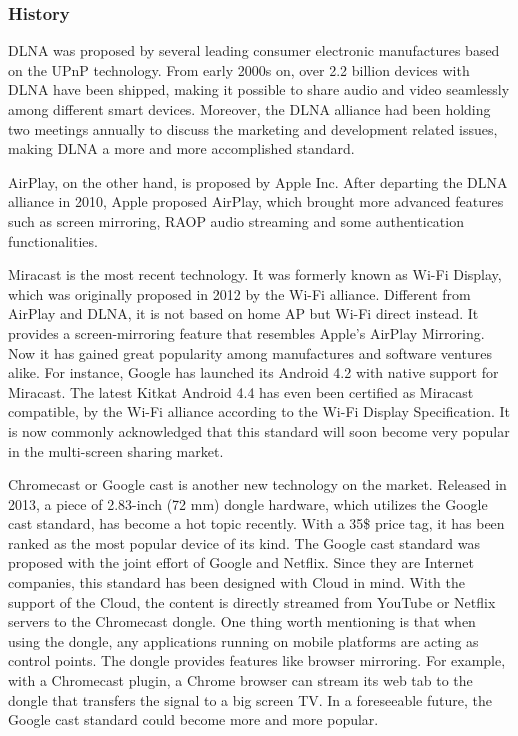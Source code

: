 \subsubsection{History\label{2_3_1}} 
DLNA was proposed by several leading consumer electronic manufactures based on
the UPnP technology. From early 2000s on, over 2.2 billion devices with DLNA
have been shipped, making it possible to share audio and video seamlessly among
different smart devices. Moreover, the DLNA alliance had been holding two
meetings annually to discuss the marketing and development related issues,
making DLNA a more and more accomplished standard.

AirPlay, on the other hand, is proposed by Apple Inc. After departing the DLNA alliance in 2010, Apple proposed AirPlay, which brought more advanced features such as screen mirroring, RAOP audio streaming and some authentication functionalities.

Miracast is the most recent technology. It was formerly known as Wi-Fi Display,
which was originally proposed in 2012 by the Wi-Fi alliance. Different from
AirPlay and DLNA, it is not based on home AP but Wi-Fi direct instead. It
provides a screen-mirroring feature that resembles Apple's AirPlay Mirroring.
Now it has gained great popularity among manufactures and software ventures
alike. For instance, Google has launched its Android 4.2 with native support
for Miracast. The latest Kitkat Android 4.4 has even been certified as Miracast
compatible, by the Wi-Fi alliance according to the Wi-Fi Display Specification.
It is now commonly acknowledged that this standard will soon become very
popular in the multi-screen sharing market.

Chromecast or Google cast is another new technology on the market. Released in
2013, a piece of 2.83-inch (72 mm) dongle hardware, which utilizes the Google
cast standard, has become a hot topic recently. With a 35\$ price tag, it has
been ranked as the most popular device of its kind. The Google cast standard
was proposed with the joint effort of Google and Netflix. Since they are
Internet companies, this standard has been designed with Cloud in mind. With
the support of the Cloud, the content is directly streamed from YouTube or
Netflix servers to the Chromecast dongle. One thing worth mentioning is that when using
the dongle, any applications running on mobile platforms are acting as
control points. The dongle provides features like browser mirroring. For
example, with a Chromecast plugin, a Chrome browser can stream its web tab to
the dongle that transfers the signal to a big screen TV. In a foreseeable
future, the Google cast standard could become more and more popular.
